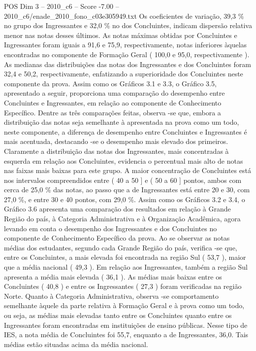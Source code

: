\begin{textsample}{POS Dim 3 – 2010\_c6 – Score -7.00 – 2010\_c6/enade\_2010\_fono\_c03e305949.txt}
Os coeficientes de variação, 39,3 \% no grupo dos Ingressantes e 32,0 \% no dos Concluintes, indicam dispersão relativa menor nas notas desses últimos.
As notas máximas obtidas por Concluintes e Ingressantes foram iguais a 91,6 e 75,9, respectivamente, notas inferiores àquelas encontradas no componente de Formação Geral ( 100,0 e 95,0, respectivamente ).
As medianas das distribuições das notas dos Ingressantes e dos Concluintes foram 32,4 e 50,2, respectivamente, enfatizando a superioridade dos Concluintes neste componente da prova.
Assim como os Gráficos 3.1 e 3.3, o Gráfico 3.5, apresentado a seguir, proporciona uma comparação do desempenho entre Concluintes e Ingressantes, em relação ao componente de Conhecimento Específico.
Dentre as três comparações feitas, observa -se que, embora a distribuição das notas seja semelhante à apresentada na prova como um todo, neste componente, a diferença de desempenho entre Concluintes e Ingressantes é mais acentuada, destacando -se o desempenho mais elevado dos primeiros.
Claramente a distribuição das notas dos Ingressantes, mais concentradas à esquerda em relação aos Concluintes, evidencia o percentual mais alto de notas nas faixas mais baixas para este grupo.
A maior concentração de Concluintes está nos intervalos compreendidos entre ( 40 a 50 ] e ( 50 a 60 ] pontos, ambos com cerca de 25,0 \% das notas, ao passo que a de Ingressantes está entre 20 e 30, com 27,0 \%, e entre 30 e 40 pontos, com 29,0 \%.
Assim como os Gráficos 3.2 e 3.4, o Gráfico 3.6 apresenta uma comparação dos resultados em relação à Grande Região do país, à Categoria Administrativa e à Organização Acadêmica, agora levando em conta o desempenho dos Ingressantes e dos Concluintes no componente de Conhecimento Específico da prova.
Ao se observar as notas médias dos estudantes, segundo cada Grande Região do país, verifica -se que, entre os Concluintes, a mais elevada foi encontrada na região Sul ( 53,7 ), maior que a média nacional ( 49,3 ).
Em relação aos Ingressantes, também a região Sul apresenta a média mais elevada ( 36,1 ).
As médias mais baixas entre os Concluintes ( 40,8 ) e entre os Ingressantes ( 27,3 ) foram verificadas na região Norte.
Quanto à Categoria Administrativa, observa -se comportamento semelhante àquele da parte relativa à Formação Geral e à prova como um todo, ou seja, as médias mais elevadas tanto entre os Concluintes quanto entre os Ingressantes foram encontradas em instituições de ensino públicas.
Nesse tipo de IES, a nota média de Concluintes foi 55,7, enquanto a de Ingressantes, 36,0.
Tais médias estão situadas acima da média nacional.

\end{textsample}
